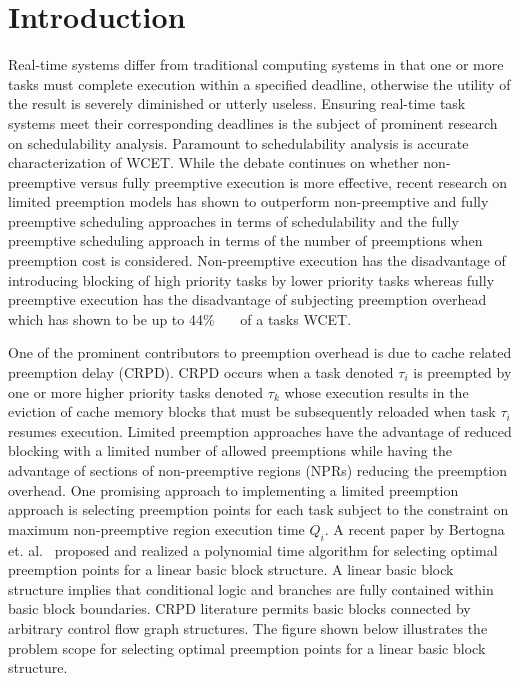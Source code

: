 \section{Introduction}\label{sec:introduction}

Real-time systems differ from traditional computing systems in that one or more tasks must complete execution within a specified deadline, otherwise the utility of the result is severely diminished or utterly useless.  Ensuring real-time task systems meet their corresponding deadlines is the subject of prominent research on schedulability analysis.  Paramount to schedulability analysis is accurate characterization of WCET.  While the debate continues on whether non-preemptive versus fully preemptive execution is more effective, recent research on limited preemption models has shown to outperform non-preemptive and fully preemptive scheduling approaches in terms of schedulability and the fully preemptive scheduling approach in terms of the number of preemptions when preemption cost is considered.  Non-preemptive execution has the disadvantage of introducing blocking of high priority tasks by lower priority tasks whereas fully preemptive execution has the disadvantage of subjecting preemption overhead which has shown to be up to 44\%~\cite{pellizzoni:07}~\cite{pellizzoni:08}~\cite{pellizzoni:11} of a tasks WCET.

One of the prominent contributors to preemption overhead is due to cache related preemption delay (CRPD).  CRPD occurs when a task denoted \begin{math}\tau_{i}\end{math} is preempted by one or more higher priority tasks denoted \begin{math}\tau_{k}\end{math} whose execution results in the eviction of cache memory blocks that must be subsequently reloaded when task \begin{math}\tau_{i}\end{math} resumes execution.  Limited preemption approaches have the advantage of reduced blocking with a limited number of allowed preemptions while having the advantage of sections of non-preemptive regions (NPRs) reducing the preemption overhead.  One promising approach to implementing a limited preemption approach is selecting preemption points for each task subject to the constraint on maximum non-preemptive region execution time \begin{math}Q_{i}\end{math}.  A recent paper by Bertogna et. al.~\cite{bertogna:11} proposed and realized a polynomial time algorithm for selecting optimal preemption points for a linear basic block structure.  A linear basic block structure implies that conditional logic and branches are fully contained within basic block boundaries. CRPD literature permits basic blocks connected by arbitrary control flow graph structures.  The figure shown below illustrates the problem scope for selecting optimal preemption points for a linear basic block structure.

